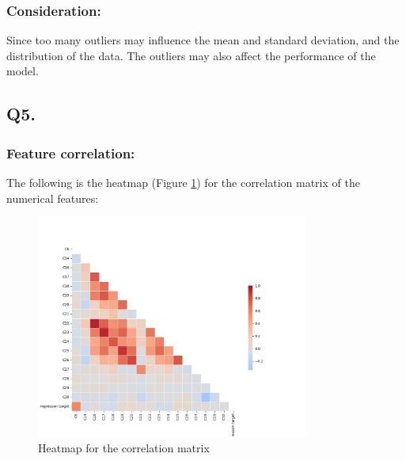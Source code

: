 \documentclass{article}
\begin{document}
\subsubsection*{Consideration:}
Since too many outliers may influence the mean and standard deviation, and the distribution of the data. The outliers may also affect the performance of the model.

\subsection*{Q5.}
\subsubsection*{Feature correlation:}

The following is the heatmap (Figure \ref{fig:heatmap}) for the correlation matrix of the numerical features:
\begin{figure}[h!]
    \centering
    \includegraphics[width=0.8\textwidth]{./pic/heatmap.png}
    \caption{Heatmap for the correlation matrix}
    \label{fig:heatmap}
\end{figure}
\end{document}
